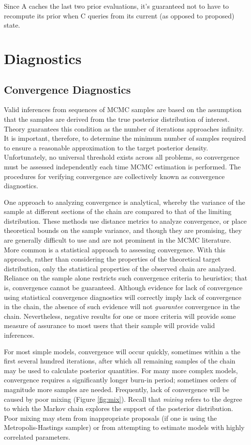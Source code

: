 \documentclass[]{book}
\begin{document}
Since A caches the last two prior evaluations, it's guaranteed not to have to recompute its prior when C queries from its current (as opposed to proposed) state.



\chapter{Diagnostics} %

\section{Convergence Diagnostics} 

Valid inferences from sequences of MCMC samples are based on the assumption that the samples are derived from the true posterior distribution of interest. Theory guarantees this condition as the number of iterations approaches infinity. It is important, therefore, to determine the minimum number of samples required to ensure a reasonable approximation to the target posterior density. Unfortunately, no universal threshold exists across all problems, so convergence must be assessed independently each time MCMC estimation is performed. The procedures for verifying convergence are collectively known as convergence diagnostics.

One approach to analyzing convergence is analytical, whereby the variance of the sample at different sections of the chain are compared to that of the limiting distribution. These methods use distance metrics to analyze convergence, or place theoretical bounds on the sample variance, and though they are promising, they are generally difficult to use and are not prominent in the MCMC literature. More common is a statistical approach to assessing convergence. With this approach, rather than considering the properties of the theoretical target distribution, only the statistical properties of the observed chain are analyzed. Reliance on the sample alone restricts such convergence criteria to heuristics; that is, convergence cannot be guaranteed. Although evidence for lack of convergence using statistical convergence diagnostics will correctly imply lack of convergence in the chain, the absence of such evidence will not \emph{guarantee} convergence in the chain. Nevertheless, negative results for one or more criteria will provide some measure of assurance to most users that their sample will provide valid inferences.

For most simple models, convergence will occur quickly, sometimes within a the first several hundred iterations, after which all remaining samples of the chain may be used to calculate posterior quantities. For many more complex models, convergence requires a significantly longer burn-in period; sometimes  orders of magnitude more samples are needed. Frequently, lack of convergence will be caused by poor mixing (Figure \ref{fig:mix}). Recall that \emph{mixing} refers to the degree to which the Markov chain explores the support of the posterior distribution. Poor mixing may stem from inappropriate proposals (if one is using the Metropolis-Hastings sampler) or from attempting to estimate models with highly correlated parameters.
\end{document}
